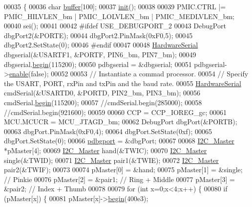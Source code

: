 \begin{DoxyCode}
00035 \{
00036     \textcolor{keywordtype}{char}    \hyperlink{_i_m_u_8cpp_a38e7c3f1ce348a3ed20459d277245263}{buffer}[100];
00037     \hyperlink{_gyro_acc_8cpp_a02fd73d861ef2e4aabb38c0c9ff82947}{init}();
00038 
00039     PMIC.CTRL |= PMIC\_HILVLEN\_bm | PMIC\_LOLVLEN\_bm | PMIC\_MEDLVLEN\_bm;
00040     sei();
00041     
00042 \textcolor{preprocessor}{#ifdef USE\_DEBUGPORT\_2}
00043 \textcolor{preprocessor}{}    DebugPort dbgPort2(&PORTE);
00044     dbgPort2.PinMask(0xF0,5);
00045     dbgPort2.SetState(0);
00046 \textcolor{preprocessor}{#endif}
00047 \textcolor{preprocessor}{}    
00048     \hyperlink{class_hardware_serial}{HardwareSerial} dbgserial(&USARTF1, &PORTF, PIN6\_bm, PIN7\_bm);
00049     dbgserial.\hyperlink{class_hardware_serial_a11049d350f4cf4bfdaafb24bb2738556}{begin}(115200);
00050     pdbgserial = &dbgserial;
00051     pdbgserial->\hyperlink{class_hardware_serial_a2e13244413a84a259cadab3fb452921a}{enable}(\textcolor{keyword}{false});
00052 
00053     \textcolor{comment}{// Instantiate a commad processor.}
00054     \textcolor{comment}{// Specify the USART, PORT, rxPin and txPin and the baud rate.}
00055     \hyperlink{class_hardware_serial}{HardwareSerial} cmdSerial(&USARTD0, &PORTD, PIN2\_bm, PIN3\_bm);
00056     cmdSerial.\hyperlink{class_hardware_serial_a11049d350f4cf4bfdaafb24bb2738556}{begin}(115200);
00057     \textcolor{comment}{//cmdSerial.begin(285000);}
00058     \textcolor{comment}{//cmdSerial.begin(921600);}
00059     
00060     CCP = CCP\_IOREG\_gc;
00061     MCU.MCUCR = MCU\_JTAGD\_bm;
00062     DebugPort dbgPort(&PORTB);
00063     dbgPort.PinMask(0xF0,4);
00064     dbgPort.SetState(0xf);
00065     dbgPort.SetState(0);
00066     \hyperlink{_gyro_acc_8cpp_ab6b6625a30d84db3519866cb8c32dd39}{pdbgport} = &dbgPort;
00067 
00068     \hyperlink{class_i2_c___master}{I2C_Master}  *pMaster[4];
00069     \hyperlink{class_i2_c___master}{I2C_Master} hand(&TWIC);
00070     \hyperlink{class_i2_c___master}{I2C_Master} single(&TWID);
00071     \hyperlink{class_i2_c___master}{I2C_Master} pair1(&TWIE);
00072     \hyperlink{class_i2_c___master}{I2C_Master} pair2(&TWIF);
00073 
00074     pMaster[0] = &hand;
00075     pMaster[1] = &single; \textcolor{comment}{// Pinkie}
00076     pMaster[2] = &pair1;  \textcolor{comment}{// Ring + Middle}
00077     pMaster[3] = &pair2;  \textcolor{comment}{// Index + Thumb}
00078     
00079     \textcolor{keywordflow}{for} (\textcolor{keywordtype}{int} x=0;x<4;x++) \{
00080         \textcolor{keywordflow}{if} (pMaster[x]) \{
00081             pMaster[x]->\hyperlink{class_i2_c___master_a4e6323d0c9dc60723d850c3783008319}{begin}(400e3);

\end{DoxyCode}
